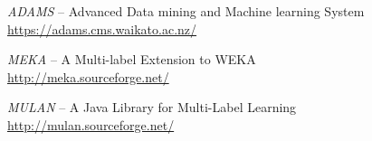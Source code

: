 %

\begin{thebibliography}{999}

		\textit{ADAMS} -- Advanced Data mining and Machine learning System \\
		\url{https://adams.cms.waikato.ac.nz/}{}
		
		\textit{MEKA} -- A Multi-label Extension to WEKA \\
		\url{http://meka.sourceforge.net/}{}
		
		\textit{MULAN} -- A Java Library for Multi-Label Learning \\
		\url{http://mulan.sourceforge.net/}{}

\end{thebibliography}
